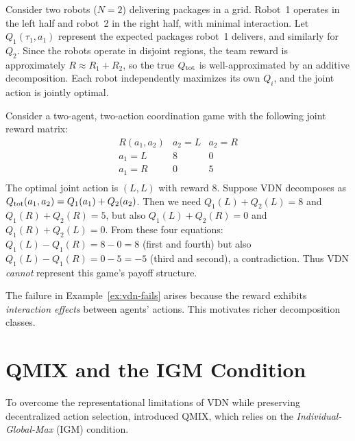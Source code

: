 \documentclass[11pt,a4paper]{article}
\begin{document}
\begin{example}
\label{ex:vdn-works}
Consider two robots ($N = 2$) delivering packages in a grid.
Robot~1 operates in the left half and robot~2 in the right half,
with minimal interaction.  Let $Q_1(\tau_1, a_1)$ represent the
expected packages robot~1 delivers, and similarly for $Q_2$.
Since the robots operate in disjoint regions, the team reward
is approximately $R \approx R_1 + R_2$, so the true $Q_{\mathrm{tot}}$
is well-approximated by an additive decomposition.  Each robot
independently maximizes its own $Q_i$, and the joint action is
jointly optimal.
\end{example}

\begin{example}
\label{ex:vdn-fails}
Consider a two-agent, two-action coordination game with the
following joint reward matrix:
\[
\begin{array}{c|cc}
  R(a_1, a_2) & a_2 = L & a_2 = R \\
  \hline
  a_1 = L & 8 & 0 \\
  a_1 = R & 0 & 5 \\
\end{array}
\]
The optimal joint action is $(L, L)$ with reward $8$.  Suppose
VDN decomposes as $Q_{\mathrm{tot}}(a_1, a_2) = Q_1(a_1) + Q_2(a_2)$.
Then we need $Q_1(L) + Q_2(L) = 8$ and $Q_1(R) + Q_2(R) = 5$,
but also $Q_1(L) + Q_2(R) = 0$ and $Q_1(R) + Q_2(L) = 0$.
From these four equations: $Q_1(L) - Q_1(R) = 8 - 0 = 8$
(first and fourth) but also $Q_1(L) - Q_1(R) = 0 - 5 = -5$
(third and second), a contradiction.  Thus VDN \emph{cannot}
represent this game's payoff structure.
\end{example}

The failure in Example~\ref{ex:vdn-fails} arises because the
reward exhibits \emph{interaction effects} between agents'
actions.  This motivates richer decomposition classes.

\section{QMIX and the IGM Condition}
\label{sec:qmix}

To overcome the representational limitations of VDN while preserving
decentralized action selection, \citet{rashid2018} introduced QMIX,
which relies on the \emph{Individual-Global-Max} (IGM) condition.
\end{document}
